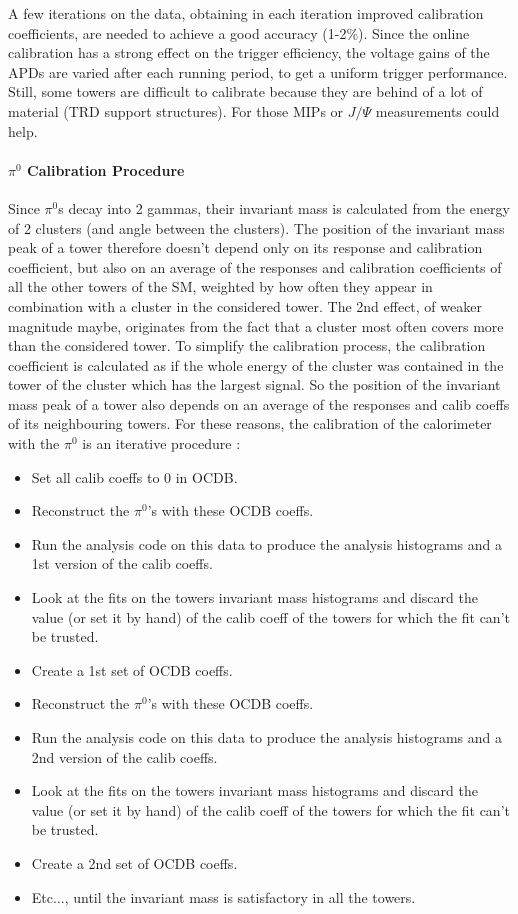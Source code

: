 A few iterations on the data, obtaining in each iteration improved calibration coefficients, are needed to achieve a good accuracy (1-2\%). Since the online calibration has a strong effect on the trigger efficiency, the voltage gains of the APDs are varied after each running period, to get a uniform trigger performance. Still, some towers are difficult to calibrate because they are behind of a lot of material (TRD support structures). For those MIPs or $J/\Psi$ measurements could help.

\paragraph*{$\pi^{0}$ Calibration Procedure\\}

Since $\pi^{0}$s decay into 2 gammas, their invariant mass is calculated from the energy of 2 clusters (and angle between the clusters). The position of the invariant mass peak of a tower therefore doesn't depend only on its response and calibration coefficient, but also on an average of the responses and calibration coefficients of all the other towers of the SM, weighted by  how often they appear in combination with a cluster in the considered tower. The 2nd effect, of weaker magnitude maybe, originates from the fact that a cluster most often covers more than the considered tower. To simplify the calibration process, the calibration coefficient is calculated as if the whole energy of the cluster was contained in the tower of the cluster which has the largest signal. So the position of the invariant mass peak of a tower also depends on an average of the responses and calib coeffs of its neighbouring towers. For these reasons, the calibration of the calorimeter with the  $\pi^{0}$ is an iterative procedure :
\begin{itemize}
\item Set all calib coeffs to 0 in OCDB.
\item Reconstruct the $\pi^{0}$'s with these OCDB coeffs.
\item Run the analysis code on this data to produce the analysis histograms and a 1st version of the calib coeffs.
\item Look at the fits on the towers invariant mass histograms and discard the value (or set it by hand) of the calib coeff of the towers for which the fit can't be trusted.
\item Create a 1st set of OCDB coeffs.
\item Reconstruct the $\pi^{0}$'s with these OCDB coeffs.
\item Run the analysis code on this data to produce the analysis histograms and a 2nd version of the calib coeffs.
\item Look at the fits on the towers invariant mass histograms and discard the value (or set it by hand) of the calib coeff of the towers for which the fit can't be trusted.
\item Create a 2nd set of OCDB coeffs.
\item Etc..., until the invariant mass is satisfactory in all the towers.
\end{itemize}

